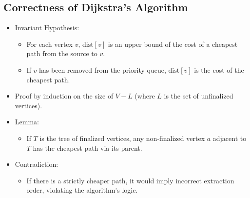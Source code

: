 \documentclass[10pt]{article}
\begin{document}
\subsection*{Correctness of Dijkstra's Algorithm}
\begin{itemize}
    \item Invariant Hypothesis:
    \begin{itemize}
        \item For each vertex \( v \), \( \text{dist}[v] \) is an upper bound of the cost of a cheapest path from the source to \( v \).
        \item If \( v \) has been removed from the priority queue, \( \text{dist}[v] \) is the cost of the cheapest path.
    \end{itemize}
    \item Proof by induction on the size of \( V - L \) (where \( L \) is the set of unfinalized vertices).
    \item Lemma:
    \begin{itemize}
        \item If \( T \) is the tree of finalized vertices, any non-finalized vertex \( a \) adjacent to \( T \) has the cheapest path via its parent.
    \end{itemize}
    \item Contradiction:
    \begin{itemize}
        \item If there is a strictly cheaper path, it would imply incorrect extraction order, violating the algorithm's logic.
    \end{itemize}
\end{itemize}
\end{document}

